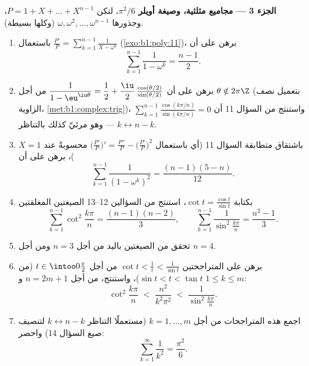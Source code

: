 \begin{problem}
\medskip
\noindent\textbf{الجزء 3 --- مجاميع مثلثية، وصيغة أويلر
$\pi^2/6$.} لتكن $P = 1 + X + \dots + X^{n-1}$، وجذورها
$\omega, \omega^2, \dots, \omega^{n-1}$ (وكلها بسيطة).
\begin{enumerate}[resume]
  \item باستعمال $\frac{P'}P = \sum_{k=1}^{n-1}\frac1{X - \omega^k}$
        (\cref{exo:b1:poly:11})، برهن على أن
        \[
        \sum_{k=1}^{n-1}\frac{1}{1 - \omega^k} = \frac{n-1}2 .
        \]
  \item برهن على أن $\dfrac1{1 - \eu^{\iu\theta}} = \dfrac12 +
        \dfrac\iu2\,\frac{\cos(\theta/2)}{\sin(\theta/2)}$ من أجل
        $\theta \notin 2\pi\Z$ (بتعميل نصف الزاوية،
        \cref{met:b1:complex:trig})، واستنتج من السؤال 11
        أن $\sum_{k=1}^{n-1}
        \frac{\cos(k\pi/n)}{\sin(k\pi/n)} = 0$ --- وهو مرئيّ كذلك
        بالتناظر $k \leftrightarrow n - k$.
  \item باشتقاق متطابقة السؤال 11 (أي باستعمال
        $\bigl(\frac{P'}P\bigr)' = \frac{P''}P -
        \bigl(\frac{P'}P\bigr)^2$ محسوبةً عند $X = 1$)، برهن على أن
        \[
        \sum_{k=1}^{n-1}\frac{1}{(1 - \omega^k)^2}
        = \frac{(n-1)(5-n)}{12} .
        \]
  \item بكتابة $\cot t = \frac{\cos t}{\sin t}$، استنتج من
        السؤالين 12--13 الصيغتين المغلقتين
        \[
        \sum_{k=1}^{n-1}\cot^2\frac{k\pi}n = \frac{(n-1)(n-2)}3,
        \qquad
        \sum_{k=1}^{n-1}\frac1{\sin^2\frac{k\pi}n}
        = \frac{n^2-1}3 .
        \]
  \item تحقق من الصيغتين باليد من أجل $n = 3$ ومن أجل $n = 4$.
  \item برهن على المتراجحتين $\cot t < \frac1t < \frac1{\sin t}$
        من أجل $t \in \intoo0{\frac\pi2}$ (من $\sin t < t < \tan
        t$)، واستنتج، من أجل $n = 2m + 1$ و $1 \leq k \leq m$:
        \[
        \cot^2\frac{k\pi}n \;<\; \frac{n^2}{k^2\pi^2}
        \;<\; \frac1{\sin^2\frac{k\pi}n} .
        \]
  \item اجمع هذه المتراجحات من أجل $k = 1, \dots, m$ (مستعملًا
        التناظر $k \leftrightarrow n - k$ لتنصيف صيغ
        السؤال 14) واحصر:
        \[
        \sum_{k=1}^{\infty}\frac1{k^2} = \frac{\pi^2}6 .
        \]
\end{enumerate}


\end{problem}
